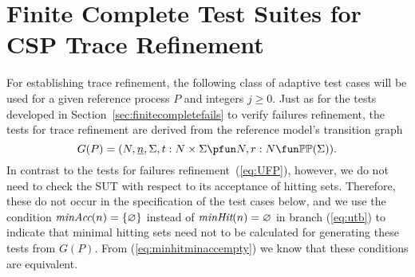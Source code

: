\section{Finite Complete Test Suites for CSP Trace Refinement}
\label{sec:finitecomplete}

For establishing trace refinement, the following class of adaptive test cases
will be used for a given reference process $P$ and  integers $j \ge 0$.
Just as for the tests developed  in
Section~\ref{sec:finitecompletefails} to verify failures refinement,
the tests for trace refinement are
derived from the reference model's transition graph
$$
G(P) = ( N, \ii n, \Sigma, t : N\times\Sigma \pfun N, r : N \fun \mathbb{P}\mathbb{P}(\Sigma)).
$$
In contrast to the tests for failures refinement~(\ref{eq:UFP}), however, we
do not need to check the SUT with respect to its acceptance of hitting sets.
Therefore, these do not occur in the specification of the test cases below,
and we use the condition $\text{\it minAcc}(n) = \{ \varnothing \}$ instead of
$\text{\it minHit}(n) = \varnothing$ in branch (\ref{eq:utb})
to indicate that minimal hitting sets need not to
be calculated for generating these tests from $G(P)$. From
(\ref{eq:minhitminaccempty}) we know that these conditions are equivalent.


